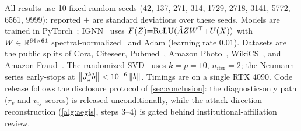All results use 10 fixed random seeds (42, 137, 271, 314, 1729, 2718, 3141, 5772, 6561, 9999); reported $\pm$
are standard deviations over these seeds. Models are trained in
PyTorch~\cite{paszke2019pytorch}; IGNN~\cite{gu2020implicit} uses
$F(Z){=}\mathrm{ReLU}(\hat{A} ZW^\top{+}U(X))$ with $W\in\mathbb{R}^{64\times64}$
spectral-normalized~\cite{miyato2018spectral} and Adam (learning rate $0.01$). Datasets are the public
splits of Cora, Citeseer, Pubmed~\cite{sen2008collective}, Amazon Photo~\cite{shchur2018pitfalls},
WikiCS~\cite{mernyei2020wiki}, and Amazon Fraud~\cite{dou2020enhancing}. The randomized
SVD~\cite{halko2011finding} uses $k{=}p{=}10$, $n_{\mathrm{iter}}{=}2$; the Neumann series early-stops at
$\left\|J_z^k b\right\|<10^{-6}\left\|b\right\|$. Timings are on a single RTX 4090. Code release follows the disclosure
protocol of \cref{sec:conclusion}: the diagnostic-only path ($r_v$ and $v_{ij}$ scores) is released
unconditionally, while the attack-direction reconstruction (\cref{alg:aegis}, steps 3--4) is gated
behind institutional-affiliation review.
